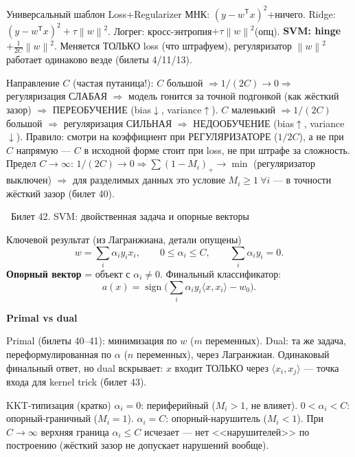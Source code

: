 \documentclass[12pt, a4paper]{article}
\newcommand{\bilet}[2]{%
  \vspace{10pt}%
  \noindent\colorbox{qcolor}{\parbox{\dimexpr\linewidth-2\fboxsep\relax}{%
    \color{white}\large\bfseries\strut\ Билет #1. #2%
  }}%
  \nopagebreak\vspace{5pt}\par\nopagebreak%
}
\newcommand{\qsub}[1]{%
  \vspace{5pt}%
  {\bfseries\color{defblue} #1}%
  \par\vspace{2pt}%
}
\newcommand{\sign}{\operatorname{sign}}
\newcommand{\tr}{^{\mathsf{T}}}
\newcommand{\norm}[1]{\left\lVert #1 \right\rVert}
\begin{document}
\begin{thmbox}{Универсальный шаблон Loss+Regularizer}
МНК: $(y-w\tr x)^2$+ничего. Ridge: $(y-w\tr x)^2+\tau\norm{w}^2$. Логрег: кросс-энтропия$+\tau\norm{w}^2$(опц). \textbf{SVM: hinge$+\frac{1}{2C}\norm{w}^2$}. Меняется ТОЛЬКО loss (что штрафуем), регуляризатор $\norm{w}^2$ работает одинаково везде (билеты 4/11/13).
\end{thmbox}

\begin{fishkabox}
Направление $C$ (частая путаница!): $C$ большой $\Rightarrow 1/(2C)\to0\Rightarrow$ регуляризация СЛАБАЯ $\Rightarrow$ модель гонится за точной подгонкой (как жёсткий зазор) $\Rightarrow$ ПЕРЕОБУЧЕНИЕ (bias$\downarrow$, variance$\uparrow$). $C$ маленький $\Rightarrow1/(2C)$ большой $\Rightarrow$ регуляризация СИЛЬНАЯ $\Rightarrow$ НЕДООБУЧЕНИЕ (bias$\uparrow$, variance$\downarrow$). Правило: смотри на коэффициент при РЕГУЛЯРИЗАТОРЕ ($1/2C$), а не при $C$ напрямую --- $C$ в исходной форме стоит при loss, не при штрафе за сложность.
Предел $C\to\infty$: $1/(2C)\to0\Rightarrow\sum(1-M_i)_+\to\min$ (регуляризатор выключен) $\Rightarrow$ для разделимых данных это условие $M_i\ge1\ \forall i$ --- в точности жёсткий зазор (билет 40).
\end{fishkabox}

\bilet{42}{SVM: двойственная задача и опорные векторы}

\begin{defbox}{Ключевой результат (из Лагранжиана, детали опущены)}
\[
  w = \sum_i \alpha_i y_i x_i, \qquad 0\le\alpha_i\le C, \qquad \sum_i\alpha_i y_i=0.
\]
\textbf{Опорный вектор} = объект с $\alpha_i\ne0$. Финальный классификатор:
\[
  a(x)=\sign\Big(\sum_i \alpha_i y_i \langle x,x_i\rangle - w_0\Big).
\]
\end{defbox}

\qsub{Primal vs dual}
Primal (билеты 40--41): минимизация по $w$ ($m$ переменных). Dual: та же задача, переформулированная по $\alpha$ ($n$ переменных), через Лагранжиан. Одинаковый финальный ответ, но dual вскрывает: $x$ входит ТОЛЬКО через $\langle x_i,x_j\rangle$ --- точка входа для kernel trick (билет 43).

\begin{propbox}{KKT-типизация (кратко)}
$\alpha_i=0$: периферийный ($M_i>1$, не влияет). $0<\alpha_i<C$: опорный-граничный ($M_i=1$). $\alpha_i=C$: опорный-нарушитель ($M_i<1$). При $C\to\infty$ верхняя граница $\alpha_i\le C$ исчезает --- нет <<нарушителей>> по построению (жёсткий зазор не допускает нарушений вообще).
\end{propbox}
\end{document}

